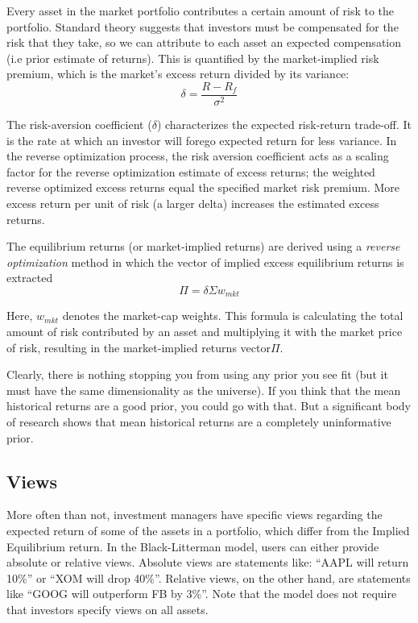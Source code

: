 Every asset in the market portfolio contributes a certain amount of risk to the portfolio. Standard theory suggests that investors must be compensated for the risk that they take, so we can attribute to each asset an expected compensation (i.e prior estimate of returns). This is quantified by the market-implied risk premium, which is the market’s excess return divided by its variance:
\begin{equation}
\delta = \frac{R-R_f}{\sigma^2}
\end{equation}

The risk-aversion coefficient ($\delta$) characterizes the expected risk-return trade-off. It is the rate at which an investor will forego expected return for less variance. In the reverse optimization process, the risk aversion coefficient acts as a scaling factor for the reverse optimization estimate of excess returns; the weighted reverse optimized excess returns equal the specified market risk premium. More excess return per unit of risk (a larger delta) increases the estimated excess returns.

The equilibrium returns (or market-implied returns) are derived using a \emph{reverse optimization} method in which the vector of implied excess equilibrium returns is extracted
\begin{equation}
\Pi=\delta \Sigma w_{mkt}
\end{equation}

Here, $w_{mkt}$ denotes the market-cap weights. This formula is calculating the total amount of risk contributed by an asset and multiplying it with the market price of risk, resulting in the market-implied returns vector$\Pi$.

Clearly, there is nothing stopping you from using any prior you see fit (but it must have the same dimensionality as the universe). If you think that the mean historical returns are a good prior, you could go with that. But a significant body of research shows that mean historical returns are a completely uninformative prior.

\subsection{Views}
More often than not, investment managers have specific views regarding the expected return of some of the assets in a portfolio, which differ from the Implied Equilibrium return. 
In the Black-Litterman model, users can either provide absolute or relative views. Absolute views are statements like: “AAPL will return 10\%” or “XOM will drop 40\%”. Relative views, on the other hand, are statements like “GOOG will outperform FB by 3\%”.
Note that the model does not require that investors specify views on all assets.

